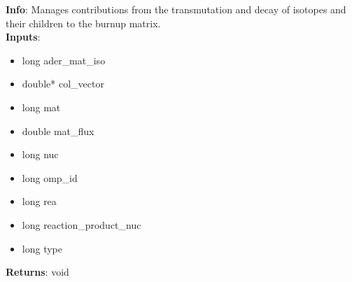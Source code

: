 \textbf{Info}: Manages contributions from the transmutation and decay of
isotopes and their children to the burnup matrix.\\

\noindent \textbf{Inputs}:
\begin{itemize}
\item{long ader\_mat\_iso}
\item{double* col\_vector}
\item{long mat}
\item{double mat\_flux}
\item{long nuc}
\item{long omp\_id}
\item{long rea}
\item{long reaction\_product\_nuc}
\item{long type}
\end{itemize}

\noindent \textbf{Returns}: void
